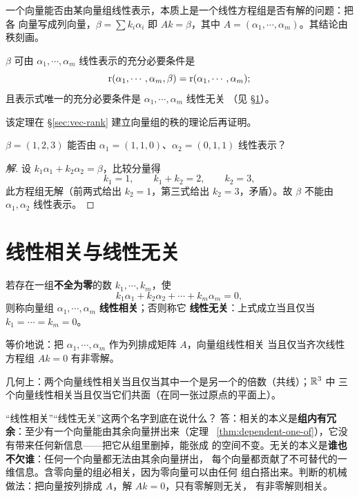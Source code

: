一个向量能否由某向量组线性表示，本质上是一个线性方程组是否有解的问题：把各
向量写成列向量，$\beta=\sum k_i\alpha_i$ 即 $Ak=\beta$，其中
$A=(\alpha_1,\cdots,\alpha_m)$。其结论由秩刻画。

\begin{theorem}\label{thm:represent-rank}
$\beta$ 可由 $\alpha_1,\cdots,\alpha_m$ 线性表示的充分必要条件是
\[
  \operatorname{r}(\alpha_1,\cdots,\alpha_m,\beta)=\operatorname{r}(\alpha_1,\cdots,\alpha_m);
\]
且表示式唯一的充分必要条件是 $\alpha_1,\cdots,\alpha_m$ 线性无关
（见 \S\ref{sec:dependence}）。
\end{theorem}

该定理在 \S\ref{sec:vec-rank} 建立向量组的秩的理论后再证明。

\begin{example}
$\beta=(1,2,3)$ 能否由 $\alpha_1=(1,1,0)$、$\alpha_2=(0,1,1)$ 线性表示？
\end{example}
\begin{proof}[解]
设 $k_1\alpha_1+k_2\alpha_2=\beta$，比较分量得
\[
  k_1=1,\qquad k_1+k_2=2,\qquad k_2=3,
\]
此方程组无解（前两式给出 $k_2=1$，第三式给出 $k_2=3$，矛盾）。故 $\beta$
不能由 $\alpha_1,\alpha_2$ 线性表示。
\end{proof}

\section{线性相关与线性无关}\label{sec:dependence}

\begin{definition}\label{def:dependence}
若存在一组\textbf{不全为零}的数 $k_1,\cdots,k_m$，使
\[
  k_1\alpha_1+k_2\alpha_2+\cdots+k_m\alpha_m=0 ,
\]
则称向量组 $\alpha_1,\cdots,\alpha_m$ \textbf{线性相关}；否则称它
\textbf{线性无关}：上式成立当且仅当 $k_1=\cdots=k_m=0$。
\end{definition}

等价地说：把 $\alpha_1,\cdots,\alpha_m$ 作为列排成矩阵 $A$，向量组线性相关
当且仅当齐次线性方程组 $Ak=0$ 有非零解。

几何上：两个向量线性相关当且仅当其中一个是另一个的倍数（共线）；$\mathbb{R}^3$ 中
三个向量线性相关当且仅当它们共面（在同一张过原点的平面上）。

\begin{qa}{“线性相关”“线性无关”这两个名字到底在说什么？}
答：相关的本义是\textbf{组内有冗余}：至少有一个向量能由其余向量拼出来（定理
~\ref{thm:dependent-one-of}），它没有带来任何新信息——把它从组里删掉，能张成
的空间不变。无关的本义是\textbf{谁也不欠谁}：任何一个向量都无法由其余向量拼出，
每个向量都贡献了不可替代的一维信息。含零向量的组必相关，因为零向量可以由任何
组白搭出来。判断的机械做法：把向量按列排成 $A$，解 $Ak=0$，只有零解则无关，
有非零解则相关。
\end{qa}

